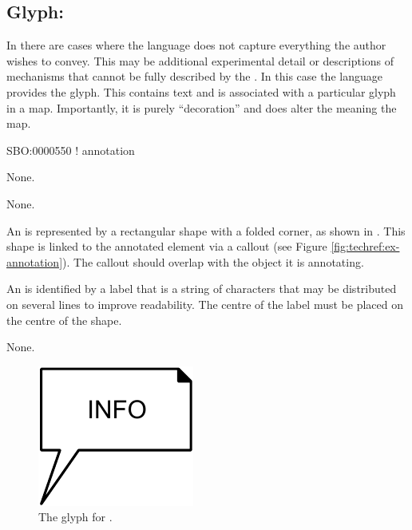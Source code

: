\subsection{Glyph: }
\label{sec:annotation}

In \SBGNPDLone there are cases where the language does not capture everything the author wishes to convey.
This may be additional experimental detail or descriptions of mechanisms that cannot be fully described by the \PDl.
In this case the language provides the  glyph. This contains text and is associated with a particular glyph in a map.
Importantly, it is purely ``decoration'' and does alter the meaning the map.

\begin{glyphDescription}

\glyphSboTerm
SBO:0000550 ! annotation


\glyphIncoming
None.



\glyphOutgoing
None.


\glyphContainer
An  is represented by a rectangular shape with a folded corner, as shown in .
This shape is linked to the annotated element via a callout (see Figure \ref{fig:techref:ex-annotation}).
The callout should overlap with the object it is annotating.

\glyphLabel
An  is identified by a label that is  a string of characters that may be distributed on several lines to improve readability.
The centre of the label must be placed on the centre of the shape.

\glyphAux
None.

\end{glyphDescription}

\begin{figure}[htb]
  \centering
  \includegraphics{images/annotation}
  \caption{The \PD glyph for .}
  \label{fig:techref:annotation}
\end{figure}

